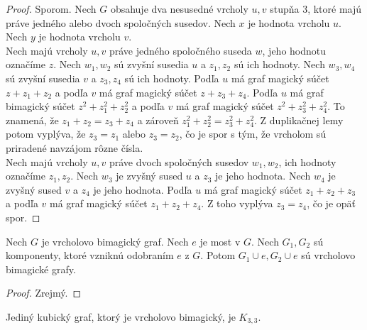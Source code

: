 \begin{proof} Sporom. Nech $G$ obsahuje dva nesusedné vrcholy $u,v$ stupňa 3, ktoré majú práve jedného alebo dvoch spoločných susedov. Nech $x$ je hodnota vrcholu $u$. Nech $y$ je hodnota vrcholu $v$. \\

Nech majú vrcholy $u,v$ práve jedného spoločného suseda $w$, jeho hodnotu označíme $z$. Nech $w_1, w_2$ sú zvyšní susedia $u$ a $z_1, z_2$ sú ich hodnoty. Nech $w_3, w_4$ sú zvyšní susedia $v$ a $z_3, z_4$ sú ich hodnoty. Podľa $u$ má graf magický súčet $z + z_1 + z_2$ a podľa $v$ má graf magický súčet $z + z_3 + z_4$. Podľa $u$ má graf bimagický súčet $z^2 + z^2_1 + z^2_2$ a podľa $v$ má graf magický súčet $z^2 + z^2_3 + z^2_4$. To znamená, že $z_1 + z_2 = z_3 + z_4$ a zároveň $z^2_1 + z^2_2 = z^2_3 + z^2_4$. Z duplikačnej lemy potom vyplýva, že $z_3 = z_1$ alebo $z_3 = z_2$, čo je spor s tým, že vrcholom sú priradené navzájom rôzne čísla. \\

Nech majú vrcholy $u,v$ práve dvoch spoločných susedov $w_1, w_2$, ich hodnoty označíme $z_1, z_2$. Nech $w_3$ je zvyšný sused $u$ a $z_3$ je jeho hodnota. Nech $w_4$ je zvyšný sused $v$ a $z_4$ je jeho hodnota. Podľa $u$ má graf magický súčet $z_1 + z_2 + z_3$ a podľa $v$ má graf magický súčet $z_1 + z_2 + z_4$. Z toho vyplýva $z_3 = z_4$, čo je opäť spor.
\end{proof}

\begin{theorem} Nech $G$ je vrcholovo bimagický graf. Nech $e$ je most v $G$. Nech $G_1, G_2$ sú komponenty, ktoré vzniknú odobraním $e$ z $G$. Potom $G_1 \cup e, G_2 \cup e$ sú vrcholovo bimagické grafy. 
\end{theorem}

\begin{proof}
Zrejmý.
\end{proof}

\begin{theorem} Jediný kubický graf, ktorý je vrcholovo bimagický, je $K_{3,3}$.
\end{theorem}

